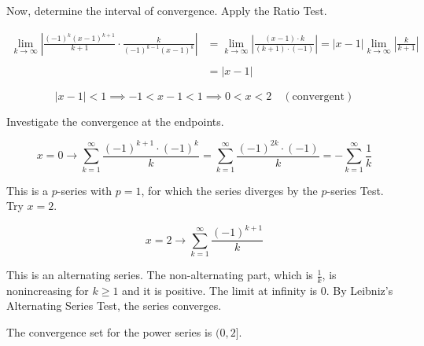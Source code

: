 \documentclass{article}
\begin{document}
\hfill

\noindent Now, determine the interval of convergence. Apply the Ratio Test.

\begin{align*}\lim_{k\to\infty}\left|\frac{(-1)^k(x-1)^{k+1}}{k+1}\cdot\frac{k}{(-1)^{k-1}(x-1)^k}\right|&=\lim_{k\to\infty}\left|\frac{(x-1)\cdot k}{(k+1)\cdot(-1)}\right|=|x-1|\lim_{k\to\infty}\left|\frac k{k+1}\right|\\\\&=|x-1|\end{align*}

\[|x-1|<1\implies-1<x-1<1\implies0<x<2\quad(\text{convergent})\]

\hfill

\noindent Investigate the convergence at the endpoints.

\[x=0\rightarrow\sum_{k=1}^{\infty}\frac{(-1)^{k+1}\cdot(-1)^k}{k}=\sum_{k=1}^{\infty}\frac{(-1)^{2k}\cdot(-1)}{k}=-\sum_{k=1}^{\infty}\frac{1}{k}\]

\hfill

\noindent This is a $p$-series with $p=1$, for which the series diverges by the $p$-series Test. Try $x=2$.

\[x=2\rightarrow\sum_{k=1}^{\infty}\frac{(-1)^{k+1}}{k}\]

\hfill

\noindent This is an alternating series. The non-alternating part, which is $\frac1k$, is nonincreasing for $k\geq1$ and it is positive. The limit at infinity is $0$. By Leibniz's Alternating Series Test, the series converges.

\hfill

\noindent The convergence set for the power series is $\boxed{(0,2]}$.
\end{document}
